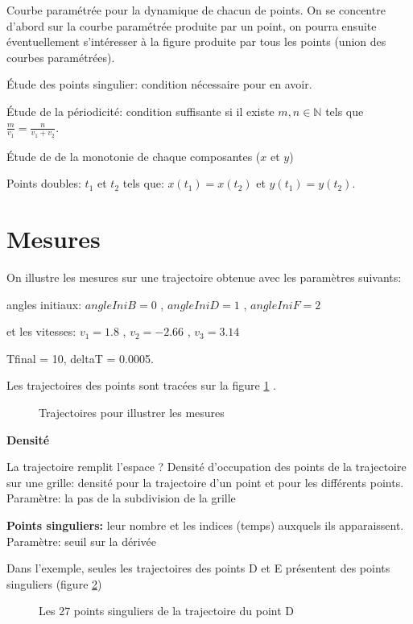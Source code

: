 \documentclass[11pt,a4paper]{article}
\newcommand{\N}{\mathbb N}%
\begin{document}
Courbe paramétrée pour la dynamique de chacun de points. On se concentre d'abord sur la courbe paramétrée produite par un point, on pourra ensuite éventuellement s'intéresser à la figure produite par tous les points (union des courbes paramétrées).

Étude des points singulier: condition nécessaire pour en avoir.

Étude de la périodicité: condition suffisante si il existe $m,n \in \N$ tels que $ \frac{m}{v_1}= \frac{n}{v_1+ v_2}$. 

Étude de de la monotonie de chaque composantes ($x$ et $y$) 

Points doubles: $t_1$ et $t_2$ tels que: $x(t_1)=x(t_2)$ et $y(t_1) = y(t_2)$.



\section{Mesures}

On illustre les mesures sur une trajectoire obtenue avec les paramètres suivants:

angles initiaux: $angleIniB = 0$ , $angleIniD = 1$ , $angleIniF = 2$

et les vitesses:
$v_1 = 1.8$ , $v_2= -2.66$ , $v_3 = 3.14$  

Tfinal = 10, deltaT = 0.0005.

Les trajectoires des points sont tracées sur la figure \ref{trajectoire_exemple_mesure} .

\begin{figure}[H] 
\caption{Trajectoires pour illustrer les mesures}
\label{trajectoire_exemple_mesure}
\end{figure}

\bigbreak

\textbf{Densité}

La trajectoire remplit l'espace ?
Densité d'occupation des points de la trajectoire sur une grille: densité pour la trajectoire d'un point et pour les différents points. Paramètre: la pas de la subdivision de la grille


\textbf{Points singuliers:} leur nombre et les indices (temps) auxquels ils apparaissent. Paramètre: seuil sur la dérivée

Dans l'exemple, seules les trajectoires des points D et E présentent des points singuliers (figure \ref{mesure_singulierD})

\begin{figure}[H] 
\caption{Les 27 points singuliers de la trajectoire du point D}
\label{mesure_singulierD}
\end{figure}
\end{document}

